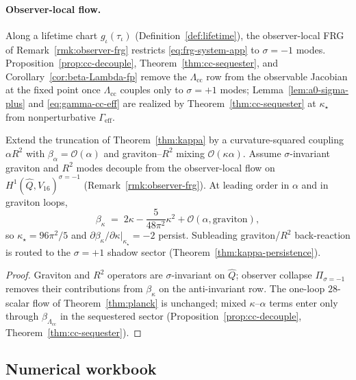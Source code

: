 \paragraph{Observer-local flow.}
Along a lifetime chart $g_\iota(\tau_\iota)$
(Definition~\ref{def:lifetime}), the observer-local FRG of
Remark~\ref{rmk:observer-frg} restricts \eqref{eq:frg-system-app} to
$\sigma=-1$ modes. Proposition~\ref{prop:cc-decouple},
Theorem~\ref{thm:cc-sequester}, and
Corollary~\ref{cor:beta-Lambda-fp} remove the $\Lambda_{\mathrm{cc}}$ row
from the observable Jacobian at the fixed point once $\Lambda_{\mathrm{cc}}$
couples only to $\sigma=+1$ modes; Lemma~\ref{lem:a0-sigma-plus} and
\eqref{eq:gamma-cc-eff} are realized by Theorem~\ref{thm:cc-sequester}
at $\kappa_\star$ from nonperturbative $\Gamma_{\mathrm{eff}}$.

\begin{proposition}
\label{prop:kappa-R2}
Extend the truncation of Theorem~\ref{thm:kappa} by a curvature-squared
coupling $\alpha R^2$ with $\beta_\alpha=\mathcal{O}(\alpha)$ and
graviton--$R^2$ mixing $\mathcal{O}(\kappa\alpha)$. Assume
$\sigma$-invariant graviton and $R^2$ modes decouple from the
observer-local flow on $H^1(\hat Q,V_{16})^{\sigma=-1}$
(Remark~\ref{rmk:observer-frg}). At leading order in $\alpha$ and in
graviton loops,
\begin{equation}\label{eq:betakappa-R2}
  \beta_\kappa
  \;=\;
  2\kappa-\frac{5}{48\pi^2}\kappa^2+\mathcal{O}(\alpha,\text{graviton}),
\end{equation}
so $\kappa_\star=96\pi^2/5$ and
$\partial\beta_\kappa/\partial\kappa|_{\kappa_\star}=-2$ persist.
Subleading graviton/$R^2$ back-reaction is routed to the
$\sigma=+1$ shadow sector (Theorem~\ref{thm:kappa-persistence}).
\end{proposition}

\begin{proof}
Graviton and $R^2$ operators are $\sigma$-invariant on $\hat Q$; observer
collapse $\Pi_{\sigma=-1}$ removes their contributions from
$\beta_\kappa$ on the anti-invariant row. The one-loop $28$-scalar flow of
Theorem~\ref{thm:planck} is unchanged; mixed $\kappa$--$\alpha$ terms enter
only through $\beta_{\Lambda_{\mathrm{cc}}}$ in the sequestered sector
(Proposition~\ref{prop:cc-decouple}, Theorem~\ref{thm:cc-sequester}).
\end{proof}

\subsection{Numerical workbook}
\label{sec:appendix:numerical}

